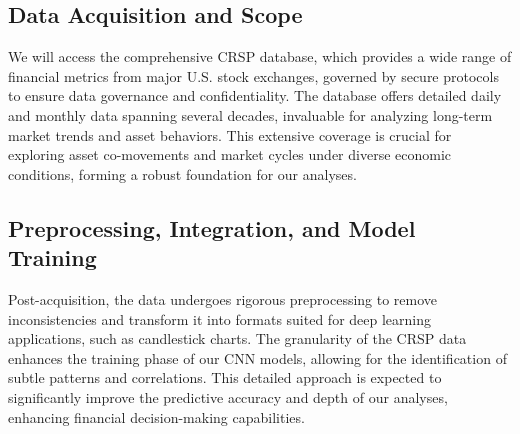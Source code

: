 \thesisspacing %

\subsection{Data Acquisition and Scope}
We will access the comprehensive CRSP database, which provides a wide range of financial metrics from major U.S. stock exchanges, governed by secure protocols to ensure data governance and confidentiality. The database offers detailed daily and monthly data spanning several decades, invaluable for analyzing long-term market trends and asset behaviors. This extensive coverage is crucial for exploring asset co-movements and market cycles under diverse economic conditions, forming a robust foundation for our analyses.

\subsection{Preprocessing, Integration, and Model Training}
Post-acquisition, the data undergoes rigorous preprocessing to remove inconsistencies and transform it into formats suited for deep learning applications, such as candlestick charts. The granularity of the CRSP data enhances the training phase of our CNN models, allowing for the identification of subtle patterns and correlations. This detailed approach is expected to significantly improve the predictive accuracy and depth of our analyses, enhancing financial decision-making capabilities.
